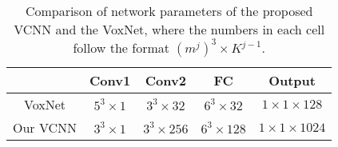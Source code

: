 \documentclass[preprint,12pt]{elsarticle}
\begin{document}
\begin{table}[t!]
\normalsize
\centering
\caption{Comparison of network parameters of the proposed VCNN and the
VoxNet, where the numbers in each cell follow the format $(m^j)^3 \times 
K^{j-1}.$}\label{table.VCNNPara}
\begin{tabular}{|c|c|c|c|c|}\hline
         & Conv1     & Conv2     & FC       & Output \\ \hline
VoxNet & $5^3\times 1 $  & $3^3 \times 32 $  & $6^3 \times 32$  & $1\times 1 \times 128$ \\ \hline
Our VCNN & $3^3\times 1 $  & $3^3 \times 256$  & $6^3 \times 128$ & $1\times 1 \times 1024$  \\ \hline
\end{tabular}%
\end{table}
\end{document}
